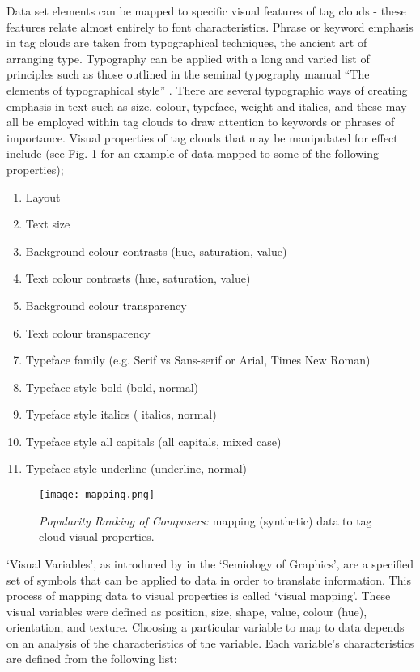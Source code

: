 
Data set elements can be mapped to specific visual features of tag clouds - these features  relate almost entirely to font characteristics. Phrase or keyword emphasis in tag clouds are taken from typographical techniques, the ancient art of arranging type. Typography can be applied with a long and varied list of principles such as those outlined in the seminal typography manual ``The elements of typographical style'' \citep{bringhurst01}. There are several typographic ways of creating emphasis in text such as size, colour, typeface, weight and italics, and these may all be employed within tag clouds to draw attention to keywords or phrases of importance. Visual properties of tag clouds that may be manipulated for effect include (see Fig. \ref{fig:mapping} for an example of data mapped to some of the following properties);

\begin{enumerate}
   	\item Layout
   	\item Text size
   	\item Background colour contrasts (hue, saturation, value)
    	\item Text colour contrasts (hue, saturation, value) 
    	\item Background colour transparency
    	\item Text colour transparency 
    	\item Typeface family (e.g. Serif vs Sans-serif or Arial, Times New Roman) 
    	\item Typeface style bold (bold, normal)
    	\item Typeface style italics ( italics, normal) 
    	\item Typeface style all capitals (all capitals, mixed case)
    	\item Typeface style underline (underline, normal) 
\end{enumerate}

\begin{figure}[h!]
	\centering
	\texttt{[image: mapping.png]}
	\caption{\emph{Popularity Ranking of Composers:} mapping (synthetic) data to tag cloud visual properties.}
	\label{fig:mapping}
\end{figure}

`Visual Variables', as introduced by \citet{bertin83} in the `Semiology of Graphics', are a specified set of symbols that can be applied to data in order to translate information. This process of mapping data to visual properties is called `visual mapping'. These visual variables were defined as position, size, shape, value, colour (hue), orientation, and texture. Choosing a particular variable to map to data depends on an analysis of the characteristics of the variable. Each variable's characteristics are defined from the following list:

